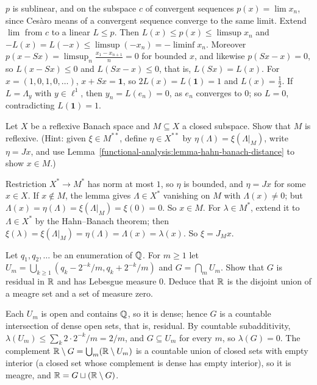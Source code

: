 \begin{solution}
$p$ is sublinear, and on the subspace $c$ of convergent sequences $p(x) = \lim x_n$, since Ces\`aro means of a convergent sequence converge to the same limit. Extend $\lim$ from $c$ to a linear $L \leq p$.
Then $L(x) \leq p(x) \leq \limsup x_n$ and $-L(x) = L(-x) \leq \limsup(-x_n) = -\liminf x_n$. Moreover $p(x - Sx) = \limsup_n\frac{x_1 - x_{n+1}}{n} = 0$ for bounded $x$, and likewise $p(Sx - x) = 0$, so
$L(x - Sx) \leq 0$ and $L(Sx - x) \leq 0$, that is, $L(Sx) = L(x)$. For $x = (1, 0, 1, 0, \ldots)$, $x + Sx = \mathbf{1}$, so $2L(x) = L(\mathbf{1}) = 1$ and $L(x) = \frac12$. If $L = \Lambda_y$ with $y \in \ell^1$, then
$y_n = L(e_n) = 0$, as $e_n$ converges to $0$; so $L = 0$, contradicting $L(\mathbf{1}) = 1$.
\end{solution}

\begin{exercise}\label{functional-analysis:exercise-closed-subspace-reflexive}
Let $X$ be a reflexive Banach space and $M \subseteq X$ a closed subspace. Show that $M$ is reflexive. (Hint: given $\xi \in M^{**}$, define $\eta \in X^{**}$ by $\eta(\Lambda) = \xi(\Lambda|_M)$, write $\eta = Jx$, and
use Lemma~\ref{functional-analysis:lemma-hahn-banach-distance} to show $x \in M$.)
\end{exercise}

\begin{solution}
Restriction $X^* \to M^*$ has norm at most $1$, so $\eta$ is bounded, and $\eta = Jx$ for some $x \in X$. If $x \notin M$, the lemma gives $\Lambda \in X^*$ vanishing on $M$ with $\Lambda(x) \neq 0$; but
$\Lambda(x) = \eta(\Lambda) = \xi(\Lambda|_M) = \xi(0) = 0$. So $x \in M$. For $\lambda \in M^*$, extend it to $\Lambda \in X^*$ by the Hahn--Banach theorem; then $\xi(\lambda) = \xi(\Lambda|_M) = \eta(\Lambda) = \Lambda(x) = \lambda(x)$.
So $\xi = J_Mx$.
\end{solution}

\begin{exercise}\label{functional-analysis:exercise-meagre-null}
Let $q_1, q_2, \ldots$ be an enumeration of $\mathbb{Q}$. For $m \geq 1$ let $U_m = \bigcup_{k \geq 1}(q_k - 2^{-k}/m, q_k + 2^{-k}/m)$ and $G = \bigcap_mU_m$. Show that $G$ is residual in $\mathbb{R}$ and has
Lebesgue measure $0$. Deduce that $\mathbb{R}$ is the disjoint union of a meagre set and a set of measure zero.
\end{exercise}

\begin{solution}
Each $U_m$ is open and contains $\mathbb{Q}$, so it is dense; hence $G$ is a countable intersection of dense open sets, that is, residual. By countable subadditivity, $\lambda(U_m) \leq \sum_k2 \cdot 2^{-k}/m = 2/m$,
and $G \subseteq U_m$ for every $m$, so $\lambda(G) = 0$. The complement $\mathbb{R} \setminus G = \bigcup_m(\mathbb{R} \setminus U_m)$ is a countable union of closed sets with empty interior (a closed set whose complement
is dense has empty interior), so it is meagre, and $\mathbb{R} = G \sqcup (\mathbb{R} \setminus G)$.
\end{solution}
